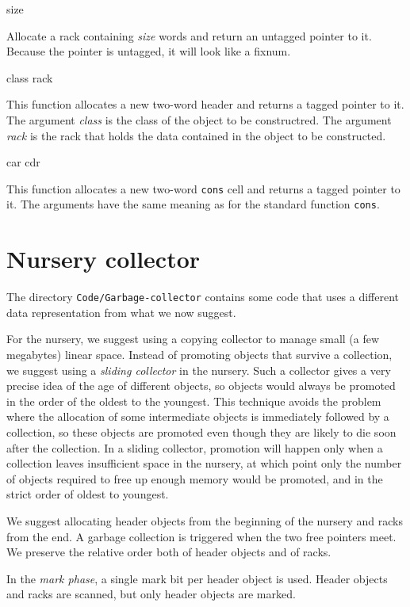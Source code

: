 {size}

Allocate a rack containing \textit{size} words and return an untagged
pointer to it.  Because the pointer is untagged, it will look like a
fixnum.

 {class rack}

This function allocates a new two-word header and returns a tagged
pointer to it.  The argument \textit{class} is the class of the object
to be constructred.  The argument \textit{rack} is the rack that holds
the data contained in the object to be constructed.

 {car cdr}

This function allocates a new two-word \texttt{cons} cell and returns
a tagged pointer to it.  The arguments have the same meaning as for
the standard \commonlisp{} function \texttt{cons}.

\section{Nursery collector}
The directory \texttt{Code/Garbage-collector} contains some code that
uses a different data representation from what we now suggest.  

For the nursery, we suggest using a copying collector to manage small
(a few megabytes) linear space.  Instead of promoting objects that
survive a collection, we suggest using a \emph{sliding collector} in
the nursery.  Such a collector gives a very precise idea of the age of
different objects, so objects would always be promoted in the order of
the oldest to the youngest.  This technique avoids the problem where
the allocation of some intermediate objects is immediately followed by
a collection, so these objects are promoted even though they are
likely to die soon after the collection.  In a sliding collector,
promotion will happen only when a collection leaves insufficient space
in the nursery, at which point only the number of objects required to
free up enough memory would be promoted, and in the strict order of
oldest to youngest.

We suggest allocating header objects from the beginning of the nursery
and racks from the end.  A garbage collection is triggered
when the two free pointers meet.  We preserve the relative order both
of header objects and of racks. 

In the \emph{mark phase}, a single mark bit per header object is
used.  Header objects and racks are scanned, but only
header objects are marked.  

